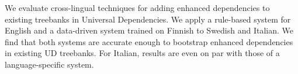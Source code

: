 We evaluate cross-lingual techniques for adding enhanced dependencies to existing treebanks in Universal Dependencies. We apply a rule-based system for English and a data-driven system trained on Finnish to Swedish and Italian. We find that both systems are accurate enough to bootstrap enhanced dependencies in existing UD treebanks. For Italian, results are even on par with those of a language-specific system.
